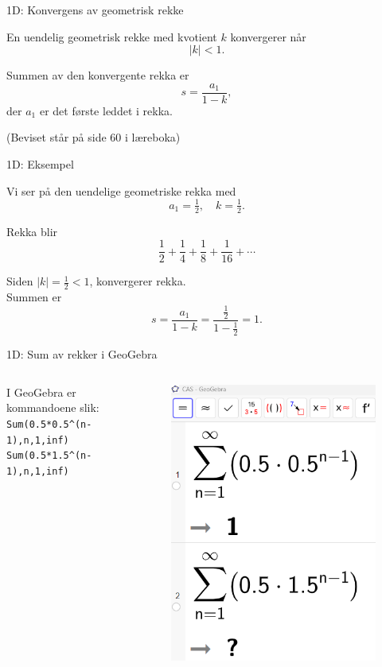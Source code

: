 \redheader
\begin{frame}{1D: Konvergens av geometrisk rekke}


En uendelig geometrisk rekke med kvotient $k$ konvergerer når
\[
|k| < 1.
\]

Summen av den konvergente rekka er
\[
s = \frac{a_1}{1-k},
\]
der $a_1$ er det første leddet i rekka.

\vspace{1cm}
(Beviset står på side 60 i læreboka)

\end{frame}
\greenheader
\begin{frame}{1D: Eksempel}


Vi ser på den uendelige geometriske rekka med
\[
a_1 = \tfrac{1}{2}, \quad k = \tfrac{1}{2}.
\]

\medskip
Rekka blir
\[
\frac{1}{2} + \frac{1}{4} + \frac{1}{8} + \frac{1}{16} + \cdots
\]

Siden $|k| = \tfrac12 < 1$, konvergerer rekka. \\

Summen er
\[
s = \frac{a_1}{1-k} = \frac{\tfrac12}{1-\tfrac12} = 1.
\]

\end{frame}


\blueheader
\begin{frame}{1D: Sum av rekker i GeoGebra}
\centering
\begin{columns}
\begin{column}{0.4\textwidth}
I GeoGebra er kommandoene slik:\\
\vspace{1cm}
\texttt{Sum(0.5*0.5\textasciicircum(n-1),n,1,inf)}\\
\vspace{1cm}
\texttt{Sum(0.5*1.5\textasciicircum(n-1),n,1,inf)}
\end{column}

\begin{column}{0.6\textwidth}
\begin{figure}
    \includegraphics[width=0.6\linewidth]{R2K1D-7.png}
\end{figure}
\end{column}
\end{columns}
\end{frame}


